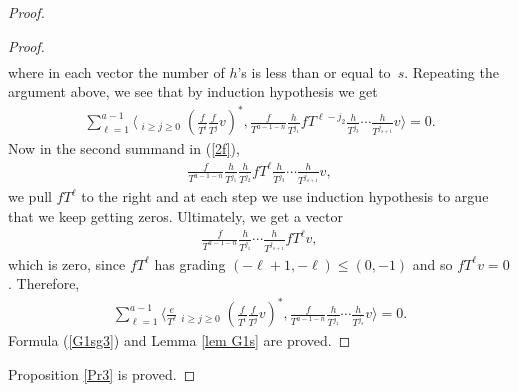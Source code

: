 \begin{proof}
\begin{proof}
\begin{gather*}
\end{gather*}
where in each vector the number of $h$'s is less than or equal to~$s$. Repeating the argument above, we see that by induction hypothesis we get
\begin{gather*}
\sum_{\ell=1}^{a-1} \bigg\langle \mathop{\sum_{i+j=a-1-\ell}}_{i\geq j\geq 0} \left(\frac{f}{T^i}\frac{f}{T^j}v\right)^*, \frac{f}{T^{a-1-n}} \frac{h}{T^{j_1}} fT^{\ell-j_2} \frac{h}{T^{j_3}} \cdots \frac{h}{T^{j_{s+1}}} v \bigg\rangle = 0.
\end{gather*}
Now in the second summand in (\ref{2f}),
\begin{gather*}
\frac{f}{T^{a-1-n}} \frac{h}{T^{j_1}} \frac{h}{T^{j_2}} fT^{\ell} \frac{h}{T^{j_3}} \cdots \frac{h}{T^{j_{s+1}}} v,
\end{gather*}
we pull $fT^{\ell}$ to the right and at each step we use induction hypothesis to argue that we keep getting zeros. Ultimately, we get a vector
\begin{gather*}
\frac{f}{T^{a-1-n}} \frac{h}{T^{j_1}} \cdots \frac{h}{T^{j_{s+1}}} fT^{\ell} v,
\end{gather*}
which is zero, since $fT^{\ell}$ has grading $(-\ell+1, -\ell) \leq (0,-1)$ and so $fT^{\ell}v=0$. Therefore,
\begin{gather*}
\sum_{\ell=1}^{a-1} \bigg\langle \frac{e}{T^{\ell}} \mathop{\sum_{i+j=a-1-\ell}}_{i\geq j\geq 0} \left(\frac{f}{T^i}\frac{f}{T^j}v\right)^*, \frac{f}{T^{a-1-n}} \frac{h}{T^{j_1}} \cdots \frac{h}{T^{j_{s}}} v \bigg\rangle = 0.
\end{gather*}
Formula (\ref{G1sg3}) and Lemma \ref{lem G1s} are proved.
\end{proof}
Proposition \ref{Pr3} is proved.
\end{proof}

